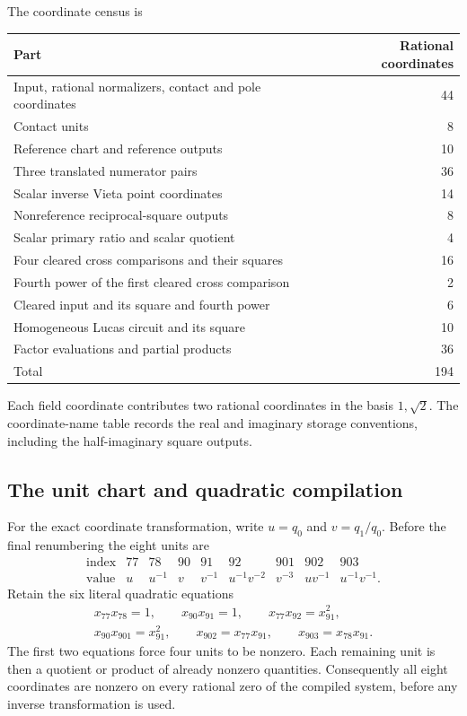 \documentclass[11pt,a4paper]{article}
\begin{document}
The coordinate census is
\begin{center}
\begin{tabular}{lr}
\hline
Part & Rational coordinates\\\hline
Input, rational normalizers, contact and pole coordinates &44\\
Contact units &8\\
Reference chart and reference outputs &10\\
Three translated numerator pairs &36\\
Scalar inverse Vieta point coordinates &14\\
Nonreference reciprocal-square outputs &8\\
Scalar primary ratio and scalar quotient &4\\
Four cleared cross comparisons and their squares &16\\
Fourth power of the first cleared cross comparison &2\\
Cleared input and its square and fourth power &6\\
Homogeneous Lucas circuit and its square &10\\
Factor evaluations and partial products &36\\\hline
Total &194\\\hline
\end{tabular}
\end{center}
Each field coordinate contributes two rational coordinates in the basis
$1,\sqrt2$. The coordinate-name table records the real and imaginary
storage conventions, including the half-imaginary square outputs.

\subsection{The unit chart and quadratic compilation}
For the exact coordinate transformation, write $u=q_0$ and
$v=q_1/q_0$. Before the final renumbering the eight units are
\[
\begin{array}{c|cccccccc}
\text{index}&77&78&90&91&92&901&902&903\\\hline
\text{value}&u&u^{-1}&v&v^{-1}&u^{-1}v^{-2}&v^{-3}&uv^{-1}&u^{-1}v^{-1}.
\end{array}
\]
Retain the six literal quadratic equations
\begin{equation}\label{eq:194-unit-guards}
\begin{gathered}
 x_{77}x_{78}=1,\qquad x_{90}x_{91}=1,\qquad
 x_{77}x_{92}=x_{91}^2,\\
 x_{90}x_{901}=x_{91}^2,\qquad
 x_{902}=x_{77}x_{91},\qquad x_{903}=x_{78}x_{91}.
\end{gathered}
\end{equation}
The first two equations force four units to be nonzero. Each remaining
unit is then a quotient or product of already nonzero quantities.
Consequently all eight coordinates are nonzero on every rational zero
of the compiled system, before any inverse transformation is used.
\end{document}
